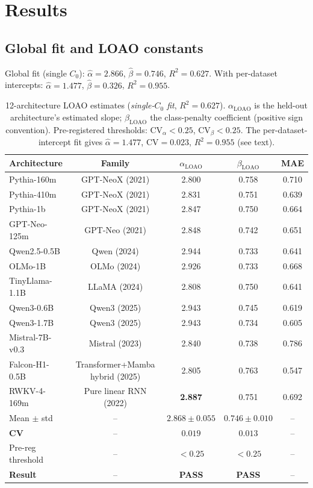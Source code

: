 \documentclass{article}
\begin{document}
\section{Results}
\subsection{Global fit and LOAO constants}
Global fit (single $C_0$): $\hat\alpha=2.866$, $\hat\beta=0.746$, $R^2=0.627$. With per-dataset intercepts: $\hat\alpha=1.477$, $\hat\beta=0.326$, $R^2=0.955$.

\begin{table}[t]
\centering
\caption{12-architecture LOAO estimates (\emph{single-$C_0$ fit}, $R^2=0.627$). $\alpha_\mathrm{LOAO}$ is the held-out architecture's estimated slope; $\beta_\mathrm{LOAO}$ the class-penalty coefficient (positive sign convention). Pre-registered thresholds: $\mathrm{CV}_\alpha < 0.25$, $\mathrm{CV}_\beta < 0.25$. The per-dataset-intercept fit gives $\hat\alpha=1.477$, $\mathrm{CV}=0.023$, $R^2=0.955$ (see text).}
\label{tab:loao-12}
\small
\begin{tabular}{lcccc}
\toprule
Architecture & Family & $\alpha_{\mathrm{LOAO}}$ & $\beta_{\mathrm{LOAO}}$ & MAE \\
\midrule
Pythia-160m & GPT-NeoX (2021) & 2.800 & 0.758 & 0.710 \\
Pythia-410m & GPT-NeoX (2021) & 2.831 & 0.751 & 0.639 \\
Pythia-1b & GPT-NeoX (2021) & 2.847 & 0.750 & 0.664 \\
GPT-Neo-125m & GPT-Neo (2021) & 2.848 & 0.742 & 0.651 \\
Qwen2.5-0.5B & Qwen (2024) & 2.944 & 0.733 & 0.641 \\
OLMo-1B & OLMo (2024) & 2.926 & 0.733 & 0.668 \\
TinyLlama-1.1B & LLaMA (2024) & 2.808 & 0.750 & 0.641 \\
Qwen3-0.6B & Qwen3 (2025) & 2.943 & 0.745 & 0.619 \\
Qwen3-1.7B & Qwen3 (2025) & 2.943 & 0.734 & 0.605 \\
Mistral-7B-v0.3 & Mistral (2023) & 2.840 & 0.738 & 0.786 \\
Falcon-H1-0.5B & Transformer+Mamba hybrid (2025) & 2.805 & 0.763 & 0.547 \\
RWKV-4-169m & Pure linear RNN (2022) & \textbf{2.887} & 0.751 & 0.692 \\
\midrule
Mean $\pm$ std & -- & $2.868\pm0.055$ & $0.746\pm0.010$ & -- \\
\textbf{CV} & -- & $\mathbf{0.019}$ & $0.013$ & -- \\
Pre-reg threshold & -- & $<0.25$ & $<0.25$ & -- \\
\textbf{Result} & -- & \textbf{PASS} & \textbf{PASS} & -- \\
\bottomrule
\end{tabular}
\end{table}
\end{document}

